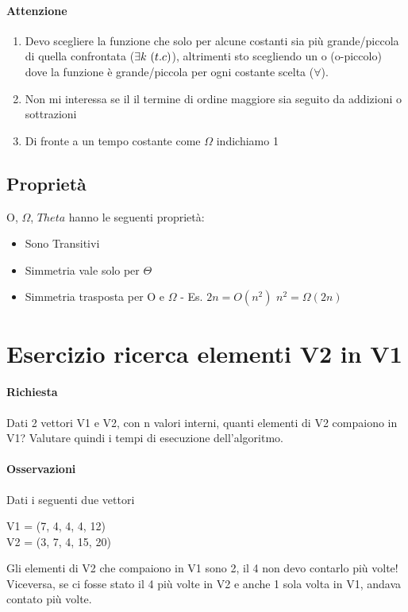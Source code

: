 \paragraph*{Attenzione}
\begin{enumerate}
    \item Devo scegliere la funzione che solo per alcune costanti sia più grande/piccola di quella confrontata
    ($\exists k \,\, \text(t.c)$),
    altrimenti sto scegliendo un o (o-piccolo) dove la funzione è grande/piccola per ogni costante scelta
    ($\forall$).
    \item Non mi interessa se il il termine di ordine maggiore sia seguito da addizioni o sottrazioni
    \item Di fronte a un tempo costante come $\Omega$ indichiamo 1
\end{enumerate}
\subsection{Proprietà}
O, $\Omega$, $Theta$ hanno le seguenti proprietà:
\begin{itemize}
    \item Sono Transitivi
    \item Simmetria vale solo per $\Theta$
    \item Simmetria trasposta per O e $\Omega$ - Es. $2n = O(n^2) \,\, n^2=\Omega(2n)$
\end{itemize}

\section{Esercizio ricerca elementi V2 in V1}
\paragraph*{Richiesta} Dati 2 vettori V1 e V2, con n valori interni, quanti elementi di
V2 compaiono in V1? Valutare quindi i tempi di esecuzione dell'algoritmo.
\paragraph*{Osservazioni} Dati i seguenti due vettori
\begin{center}
    V1 = (7, 4, 4, 4, 12)\\
    V2 = (3, 7, 4, 15, 20)
\end{center}
Gli elementi di V2 che compaiono in V1 sono 2, il 4 non devo contarlo più volte!\\
Viceversa, se ci fosse stato il 4 più volte in V2 e anche 1 sola volta in V1, andava contato
più volte.
